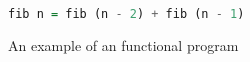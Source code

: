 \begin{figure}[htb]
    \centering
    \begin{lstlisting}[language=Haskell]
fib n = fib (n - 2) + fib (n - 1)
\end{lstlisting}
    \caption{An example of an functional program}
    \label{fig:functional_example}
\end{figure}
